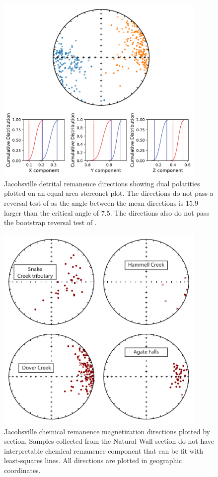 \begin{figure}
\centering
\includegraphics[width=0.9\textwidth]{figure/Zhang2024a/SI_reversal_test.pdf}
\caption{Jacobsville detrital remanence directions showing dual polarities plotted on an equal area stereonet plot. The directions do not pass a reversal test of \cite{McFadden1990a} as the angle between the mean directions is 15.9\textdegree\, larger than the critical angle of 7.5\textdegree. The directions also do not pass the bootstrap reversal test of \cite{Tauxe1991a}. }
\label{fig:Jacobsville_reversal_test}
\end{figure}

\begin{figure}
\centering
\includegraphics[width=0.9\textwidth]{figure/Zhang2024a/SI_hct.pdf}
\caption{Jacobsville chemical remanence magnetization directions plotted by section. Samples collected from the Natural Wall section do not have interpretable chemical remanence component that can be fit with least-squares lines. All directions are plotted in geographic coordinates.}
\label{fig:Jacobsville_CRM}
\end{figure}

